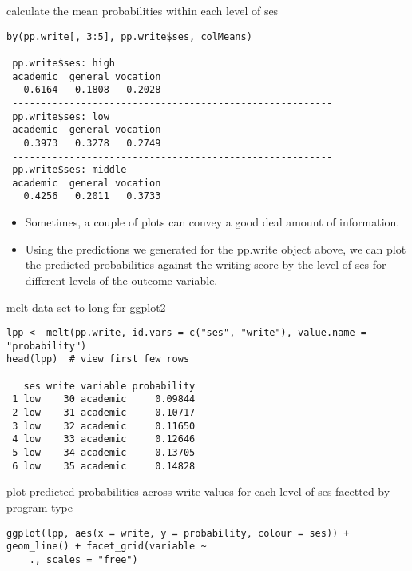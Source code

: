 \begin{frame}[fragile]
 calculate the mean probabilities within each level of ses
\begin{verbatim}
by(pp.write[, 3:5], pp.write$ses, colMeans)
 
 pp.write$ses: high
 academic  general vocation 
   0.6164   0.1808   0.2028 
 -------------------------------------------------------- 
 pp.write$ses: low
 academic  general vocation 
   0.3973   0.3278   0.2749 
 -------------------------------------------------------- 
 pp.write$ses: middle
 academic  general vocation 
   0.4256   0.2011   0.3733
\end{verbatim}
\end{frame}
\begin{frame}[fragile] 
\begin{itemize}
\item Sometimes, a couple of plots can convey a good deal amount of information. 
\item Using the predictions we generated for the pp.write object above, we can plot the predicted probabilities against the writing score by the level 
of ses for different levels of the outcome variable.
\end{itemize} 
\end{frame}
\begin{frame}[fragile] 
 melt data set to long for ggplot2
\begin{verbatim}
lpp <- melt(pp.write, id.vars = c("ses", "write"), value.name = "probability")
head(lpp)  # view first few rows
 
   ses write variable probability
 1 low    30 academic     0.09844
 2 low    31 academic     0.10717
 3 low    32 academic     0.11650
 4 low    33 academic     0.12646
 5 low    34 academic     0.13705
 6 low    35 academic     0.14828
\end{verbatim}
\end{frame}
\begin{frame}[fragile]  
 plot predicted probabilities across write values for each level of ses
 facetted by program type
\begin{verbatim}
ggplot(lpp, aes(x = write, y = probability, colour = ses)) + geom_line() + facet_grid(variable ~
    ., scales = "free")
 
\end{verbatim}
\end{frame}
